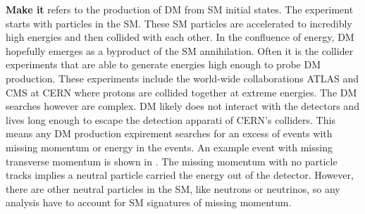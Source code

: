 \textbf{Make it} refers to the production of DM from SM initial states.
The experiment starts with particles in the SM.
These SM particles are accelerated to incredibly high energies and then collided with each other.
In the confluence of energy, DM hopefully emerges as a byproduct of the SM annihilation.
Often it is the collider experiments that are able to generate energies high enough to probe DM production.
These experiments include the world-wide collaborations ATLAS and CMS at CERN where protons are collided together at extreme energies.
The DM searches however are complex.
DM likely does not interact with the detectors and lives long enough to escape the detection apparati of CERN's colliders.
This means any DM production expirement searches for an excess of events with missing momentum or energy in the events.
An example event with missing transverse momentum is shown in .
The missing momentum with no particle tracks implies a neutral particle carried the energy out of the detector.
However, there are other neutral particles in the SM, like neutrons or neutrinos, so any analysis have to account for SM signatures of missing momentum. \cite{atlas:met_dm_precise}

\begin{figure}[h]
\end{figure}

